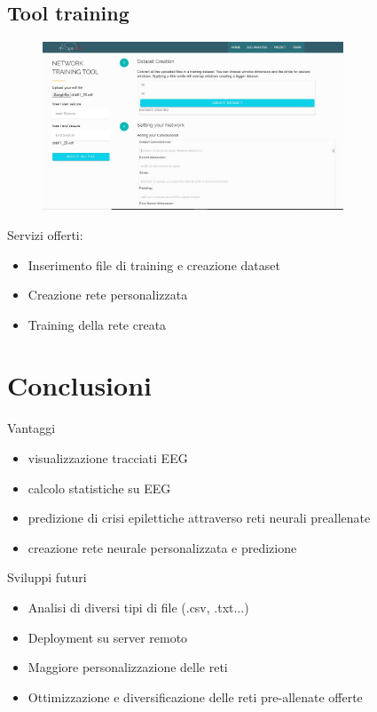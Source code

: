 \documentclass[xcolor=x11names,compress, 
]{beamer}
\theoremstyle{definition} \newtheorem{esempio}{Esempio}
\theoremstyle{definition}
\begin{document}
	\subsection{Tool training}
		\begin{frame}{\subsecname}
			\begin{figure}
				\includegraphics[width=0.8\textwidth]{immagini/training1}
			\end{figure}
			Servizi offerti:
			\begin{itemize}
				\item Inserimento file di training e creazione dataset
				\item Creazione rete personalizzata
				\item Training della rete creata
			\end{itemize}
		\end{frame}
		
		



\section*{Conclusioni}
	\begin{frame}{Vantaggi}
		\begin{itemize}
			\item visualizzazione tracciati EEG
			\item calcolo statistiche su EEG
			\item predizione di crisi epilettiche attraverso reti neurali preallenate
			\item creazione rete neurale personalizzata e predizione
		\end{itemize}
	\end{frame}

	\begin{frame}{Sviluppi futuri}
		\begin{itemize}
			\item Analisi di diversi tipi di file (.csv, .txt...)
			\item Deployment su server remoto\pause
			\item Maggiore personalizzazione delle reti \pause
			\item Ottimizzazione e diversificazione delle reti pre-allenate offerte
		\end{itemize}
	\end{frame}
	
\end{document}
